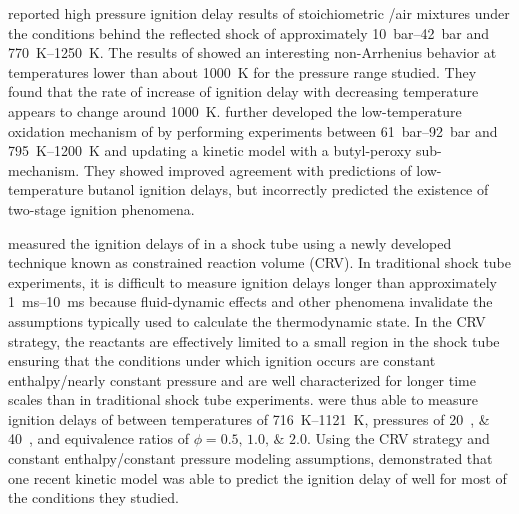 \documentclass[../main.tex]{subfiles}
\begin{document}
\textcite{Heufer2011} reported high pressure ignition delay
results of stoichiometric \nBuOH{}/air mixtures under the
conditions behind the reflected shock of approximately \SIrange{10}{42}{\bar}
and \SIrange{770}{1250}{\kelvin}. The results of \textcite{Heufer2011}
showed an interesting non-Arrhenius behavior at
temperatures lower than about \SI{1000}{\kelvin} for the pressure range
studied. They found that the rate of increase of ignition delay with
decreasing temperature appears to change around \SI{1000}{\kelvin}.
\textcite{Vranckx2011} further developed the low-temperature oxidation
mechanism of \nBuOH{} by performing experiments between
\SIrange{61}{92}{\bar} and \SIrange{795}{1200}{\kelvin} and updating
a kinetic model with a butyl-peroxy sub-mechanism. They showed improved
agreement with predictions of low-temperature butanol ignition delays,
but incorrectly predicted the existence of two-stage ignition phenomena.

\textcite{Zhu2014} measured the ignition delays of \nBuOH{}
in a shock tube using a newly developed technique known as constrained
reaction volume (CRV). In traditional shock tube experiments,
it is difficult to measure ignition delays longer than approximately
\SIrange{1}{10}{\milli\second} because fluid-dynamic effects and other
phenomena invalidate the assumptions typically used to calculate the
thermodynamic state. In the CRV strategy, the reactants are effectively
limited to a small region in the shock tube ensuring that the conditions
under which ignition occurs are constant enthalpy/nearly constant pressure
and are well characterized for longer time
scales than in traditional shock tube experiments. \textcite{Zhu2014}
were thus able to measure ignition delays of \nBuOH{} between
temperatures of \SIrange{716}{1121}{\kelvin}, pressures of
\SIlist{20;40}{\atmosphere}, and equivalence ratios of
$\phi = \numlist{0.5;1.0;2.0}$. Using the CRV strategy and constant
enthalpy/constant pressure modeling assumptions, \textcite{Zhu2014}
demonstrated that one recent kinetic model was able to predict the
ignition delay of \nBuOH{} well for most of the conditions
they studied.
\end{document}
